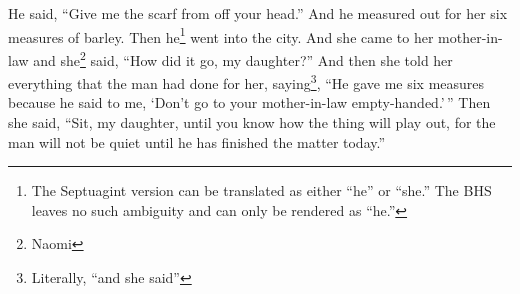 \begin{inparaenum}
     He said, ``Give me the scarf from off your head.'' And he measured out for her six measures of barley. Then he\footnote{The Septuagint version can be translated as either ``he'' or ``she.'' The BHS leaves no such ambiguity and can only be rendered as ``he.''} went into the city.%
     And she came to her mother-in-law and she\footnote{Naomi} said, ``How did it go, my daughter?'' And then she told her everything that the man had done for her,%
     saying\footnote{Literally, ``and she said''}, ``He gave me six measures because he said to me, `Don't go to your mother-in-law empty-handed.'\,''%
     Then she said, ``Sit, my daughter, until you know how the thing will play out, for the man will not be quiet until he has finished the matter today.''%
\end{inparaenum}
